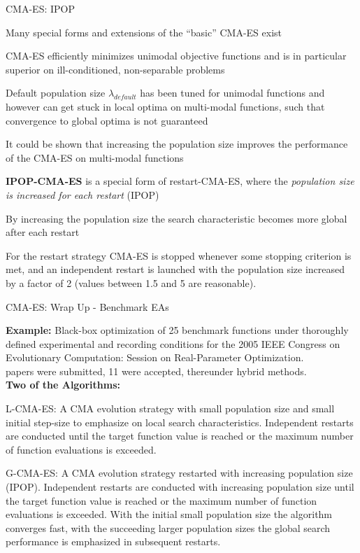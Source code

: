 \documentclass[11pt,compress,t,notes=noshow, xcolor=table]{beamer}
\begin{document}
\begin{framei}[fs=footnotesize]{CMA-ES: IPOP}
\item Many special forms and extensions of the \enquote{basic} CMA-ES exist
\item CMA-ES efficiently minimizes unimodal objective functions and is in particular superior on ill-conditioned, non-separable problems
\item Default population size $\lambda_{default}$ has been tuned for unimodal
functions and however can get stuck in local optima on multi-modal functions, such that convergence to global optima is not guaranteed
\item It could be shown that increasing the population size improves the performance of the CMA-ES on multi-modal functions
\item \textbf{IPOP-CMA-ES} is a special form of restart-CMA-ES, where the \textit{population size is increased for each restart} (IPOP)
\item By increasing the population size the search characteristic becomes more global after each restart
\item For the restart strategy CMA-ES is stopped whenever some stopping criterion is met, and an independent restart is launched with the population size increased by a factor of 2 (values between 1.5 and 5 are reasonable).
\end{framei}


\begin{framei}[fs=footnotesize]{CMA-ES: Wrap Up - Benchmark EAs}
\item \textbf{Example:} Black-box optimization of 25 benchmark functions under thoroughly defined experimental and recording conditions for the 2005 IEEE Congress on Evolutionary Computation: Session on Real-Parameter Optimization. \\
 papers were submitted, 11 were accepted, thereunder hybrid methods.\\
\textbf{Two of the Algorithms:}
\item L-CMA-ES: A CMA evolution strategy with small population size and small initial step-size to emphasize on local search characteristics. Independent restarts are conducted until the target function value is reached or the maximum number of function evaluations is exceeded. 
\item G-CMA-ES: A CMA evolution strategy restarted with increasing population size (IPOP). Independent restarts are conducted with increasing population size until the target function value is reached or the maximum number of function evaluations is exceeded. With the initial small population size the algorithm converges fast, with the succeeding larger population sizes the global search performance is emphasized in subsequent restarts. 
\end{framei}
\end{document}

